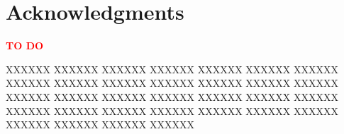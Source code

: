 \section*{Acknowledgments}
\label{section:acknowledgments}
\pagestyle{plain}

\textcolor{red}{\textbf{TO DO}}\newline

XXXXXX XXXXXX XXXXXX XXXXXX XXXXXX XXXXXX XXXXXX XXXXXX XXXXXX XXXXXX XXXXXX XXXXXX XXXXXX XXXXXX XXXXXX XXXXXX XXXXXX XXXXXX XXXXXX XXXXXX XXXXXX XXXXXX XXXXXX XXXXXX XXXXXX XXXXXX XXXXXX XXXXXX XXXXXX XXXXXX XXXXXX XXXXXX 
